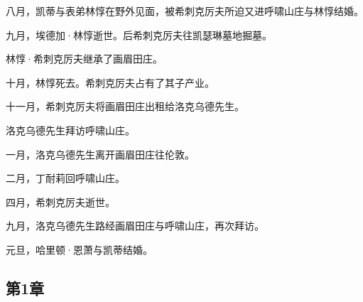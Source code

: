 \par {} 八月，凯蒂与表弟林惇在野外见面，被希刺克厉夫所迫又进呼啸山庄与林惇结婚。
\par 九月，埃德加·林惇逝世。后希刺克厉夫往凯瑟琳墓地掘墓。
\par 林惇·希刺克厉夫继承了画眉田庄。
\par 十月，林惇死去。希刺克厉夫占有了其子产业。
\par 十一月，希刺克厉夫将画眉田庄出租给洛克乌德先生。
\par 洛克乌德先生拜访呼啸山庄。
\par {} 一月，洛克乌德先生离开画眉田庄往伦敦。
\par 二月，丁耐莉回呼啸山庄。
\par 四月，希刺克厉夫逝世。
\par 九月，洛克乌德先生路经画眉田庄与呼啸山庄，再次拜访。
\par {} 元旦，哈里顿·恩萧与凯蒂结婚。


\subsection{第1章}

